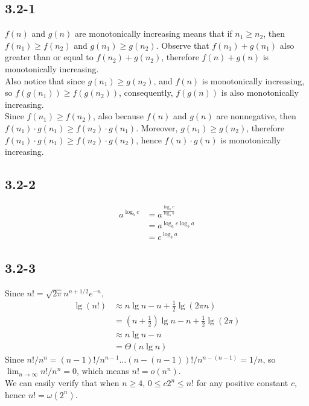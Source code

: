 \subsection{3.2-1}
	$f(n)$ and $g(n)$ are monotonically increasing 
	means that if $n_1\ge n_2$, then $f(n_1)\ge
	f(n_2)$ and $g(n_1)\ge g(n_2)$. Observe that
	$f(n_1)+g(n_1)$ also greater than or equal to
	$f(n_2)+g(n_2)$, therefore $f(n)+g(n)$ is
	monotonically increasing.\\
	Also notice that since $g(n_1)\ge g(n_2)$,
	and $f(n)$ is monotonically increasing, so
	$f(g(n_1))\ge f(g(n_2))$, consequently, 
	$f(g(n))$ is also monotonically increasing.\\
	Since $f(n_1)\ge f(n_2)$, 
	also because $f(n)$ and $g(n)$ are nonnegative, 
	then $f(n_1)\cdot g(n_1)\ge f(n_2)\cdot g(n_1)$. 
	Moreover,
	$g(n_1)\ge g(n_2)$, therefore $f(n_1)\cdot g(n_1)
	\ge f(n_2)\cdot g(n_2)$, hence $f(n)\cdot g(n)$
	is monotonically increasing.
\subsection{3.2-2}
	\begin{align*}
		a^{\log_b{c}} &= a^{\frac{\log_a{c}}{\log_a{b}}}\\
					  &= a^{\log_a{c}\log_b{a}}\\
					  &= c^{\log_b{a}}
	\end{align*}
\subsection{3.2-3}
	Since $n!=\sqrt{2\pi}n^{n+1/2}e^{-n}$,
	\begin{align*}
		\lg (n!)	&\approx	n\lg n - n + \frac{1}{2}
		\lg(2\pi n)	\\
				&=(n+\frac{1}{2})\lg n -n + \frac
				{1}{2}\lg(2\pi)	\\
				&\approx n\lg n -n	\\
				&=	\Theta(n\lg n)
	\end{align*}
	Since $n!/n^n=(n-1)!/n^{n-1}\ldots (n-(n-1))!/
	n^{n-(n-1)}=1/n$, so $\lim_{n\to \infty}n!/n^n=0$,
	which means $n!=o(n^n)$.\\
	We can easily verify that when $n\ge4$, $0\le c2^n
	\le n!$ for any positive constant $c$, hence 
	$n!=\omega(2^n)$.
